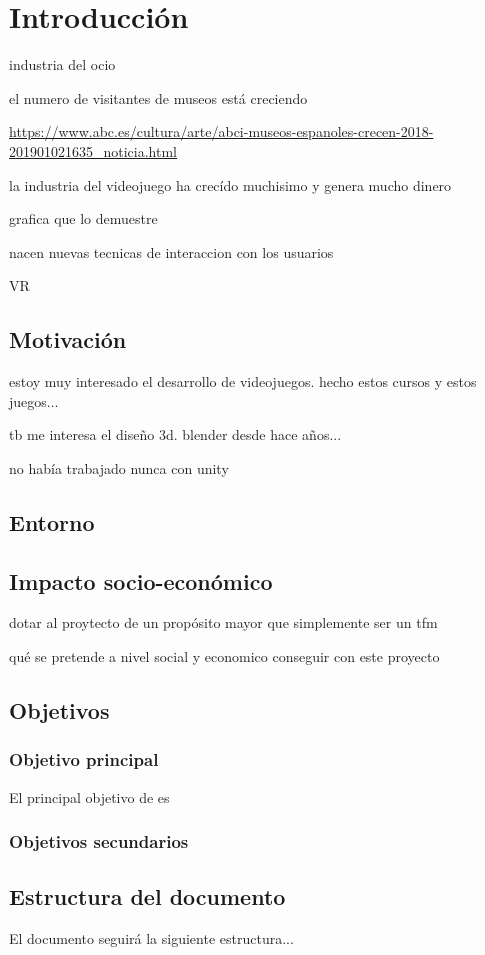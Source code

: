 \chapter{Introducción}
\label{chap:introduccion}

industria del ocio

el numero de visitantes de museos está creciendo

\url{https://www.abc.es/cultura/arte/abci-museos-espanoles-crecen-2018-201901021635_noticia.html}

la industria del videojuego ha crecído muchisimo y genera mucho dinero

grafica que lo demuestre

nacen nuevas tecnicas de interaccion con los usuarios

VR


\section{Motivación}

estoy muy interesado el desarrollo de videojuegos. hecho estos cursos y estos juegos...

tb me interesa el diseño 3d. blender desde hace años...

no había trabajado nunca con unity

\section{Entorno}

\section{Impacto socio-económico}

dotar al proytecto de un propósito mayor que simplemente ser un tfm

qué se pretende a nivel social y economico conseguir con este proyecto

\section{Objetivos}

\subsection{Objetivo principal}

El principal objetivo de \MineRVa es 

\subsection{Objetivos secundarios}

\section{Estructura del documento}

El documento seguirá la siguiente estructura...